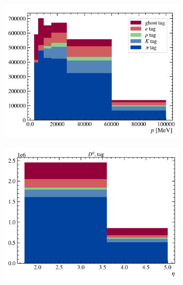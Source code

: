 \begin{figure}[htb]
    \centering
    \begin{subfigure}[b]{0.32\textwidth}
        \centering
        \includegraphics[width=\textwidth]{figs-fit-fit-templates/data-driven-plots/misid/D0-tag_p.pdf}
    \end{subfigure}
    \hfill
    \begin{subfigure}[b]{0.32\textwidth}
        \centering
        \includegraphics[width=\textwidth]{figs-fit-fit-templates/data-driven-plots/misid/D0-tag_eta.pdf}
    \end{subfigure}
    \hfill

\end{figure}
